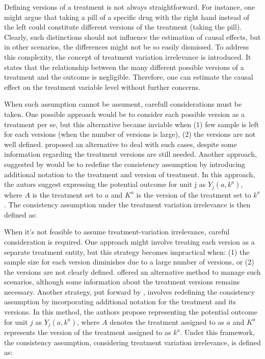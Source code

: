 Defining versions of a treatment is not always straightforward. For instance, one might argue that taking a pill of a specific drug with the right hand instead of the left could constitute different versions of the treatment (taking the pill). Clearly, such distinctions should not influence the estimation of causal effects, but in other scenarios, the differences might not be so easily dismissed.
To address this complexity, the concept of treatment variation irrelevance is introduced. It states that the relationship between the many different possible versions of a treatment and the outcome is negligible. Therefore, one can estimate the causal effect on the treatment variable level without further concerns.

When such assumption cannot be assument, carefull considerations must be taken. One possible approach would be to consider each possible version as a treatment per se, but this alternative became inviable when (1) few sample is left for each versions (when the number of versions is large), (2) the versions are not well defined. \textcite{lanza_causal_2013} proposed an alternative to deal with such cases,
despite some information regarding the treatment versions are still needed. Another approach, suggested by \textcite{vanderweeleCausalInferenceMultiple2013} would be to redefine the consistency assumption by introducing additional notation to the treatment and version of treatment. In this approach, the autors suggest expressing the potential outcome for unit j as $Y_j(a, k^a)$, where $A$ is the
treatment set to $a$ and $K^a$ is the version of the treatment set to $k^a$. The consistency assumption under the treatment variation irrelevance is then defined as:

When it's not feasible to assume treatment-variation irrelevance, careful consideration is required. One approach might involve treating each version as a separate treatment entity, but this strategy becomes impractical when: (1) the sample size for each version diminishes due to a large number of versions, or (2) the versions are not clearly defined. \textcite{lanza_causal_2013} offered an alternative method to
manage such scenarios, although some information about the treatment versions remains necessary. Another strategy, put forward by \textcite{vanderweeleCausalInferenceMultiple2013}, involves redefining the consistency assumption by incorporating additional notation for the treatment and its versions. In this method, the authors propose representing the potential outcome for unit $j$ as $Y_j(a, k^a)$, where $A$ denotes
the treatment assigned to as $a$ and $K^a$ represents the version of the treatment assigned to as $k^a$. Under this framework, the consistency assumption, considering treatment variation irrelevance, is defined as:

